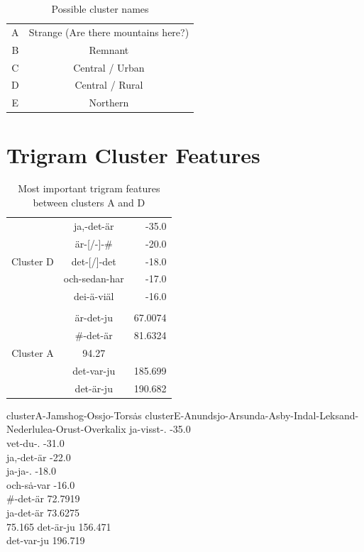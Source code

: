 \begin{table}
  \begin{tabular}{cc}
    A & Strange (Are there mountains here?) \\
    B & Remnant \\
    C & Central / Urban \\
    D & Central / Rural \\
    E & Northern \\
    \end{tabular}
    \label{cluster-names}
    \caption{Possible cluster names}
\end{table}

\section{Trigram Cluster Features}
\begin{table}
\begin{tabular}{rcr}
& ja,-det-\"ar & -35.0 \\
& \"ar-[/-]-\# & -20.0 \\
Cluster D & det-[/]-det & -18.0 \\
& och-sedan-har & -17.0 \\
& dei-\"a-vi\"al & -16.0 \\ \hline \\
& \"ar-det-ju & 67.0074 \\
& \#-det-\"ar & 81.6324 \\
 Cluster A & 94.27 & \\
& det-var-ju & 185.699 \\
& det-\"ar-ju & 190.682 \\
\end{tabular}
\label{trigram-feature-A-D}
\caption{Most important trigram features between clusters A and D}
\end{table}

clusterA-Jamshog-Ossjo-Tors\.as
clusterE-Anundsjo-Arsunda-Asby-Indal-Leksand-Nederlulea-Orust-Overkalix
ja-visst-. -35.0 \\
vet-du-. -31.0 \\
ja,-det-\"ar -22.0 \\
ja-ja-. -18.0 \\
och-s\.a-var -16.0 \\
\#-det-\"ar 72.7919 \\
ja-det-\"ar 73.6275 \\
 75.165
det-\"ar-ju 156.471 \\
det-var-ju 196.719 \\


